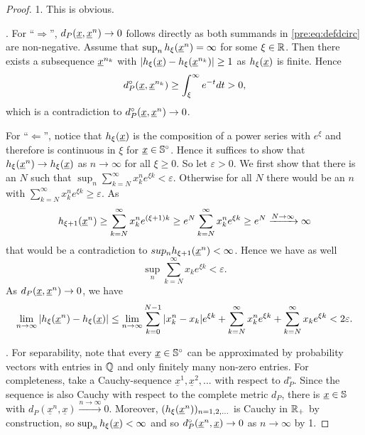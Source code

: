 \begin{proof}
1. This is obvious.

. For ``$\Rightarrow$'', $d_P(\underline{x},\underline{x}^n) \to 0$ follows directly as both summands in
\eqref{pre:eq:defdcirc} are non-negative. Assume that $\sup_n
h_\xi(\underline{x}^n) = \infty$ for some $\xi \in \mathbb{R}$. Then there exists a
subsequence $\underline{x}^{n_k}$ with $|h_\xi(\underline{x}) - h_\xi(\underline{x}^{n_k})| \geq 1 $ as $h_\xi(\underline{x})$ is finite. Hence
\[ d_P^\circ(\underline{x},\underline{x}^{n_k}) \geq \int_\xi^\infty e^{-t} dt > 0, \]
which is a contradiction to $d_P^\circ(\underline{x},\underline{x}^{n}) \to 0$.

\noindent
For ``$\Leftarrow$'', notice that $h_\xi(\underline{x})$ is the composition of a power series with 
$e^\xi$ and therefore is continuous in $\xi$ for $\underline{x} \in
\mathbb{S}^\circ$. Hence it suffices to show that $h_\xi(\underline{x}^n) \to h_\xi(\underline{x})$ as $n \to \infty$ for all $\xi \geq 0$. So
let $\varepsilon > 0$. We first show that there is an $N$ such that 
$\sup_n \sum_{k=N}^\infty x_k^n e^{\xi k} < \varepsilon$. Otherwise for all $N$ there would be an
$n$ with $\sum_{k=N}^\infty x_k^n e^{\xi k} \geq \varepsilon$. As
\[
h_{\xi+1}(\underline{x}^n) 
\geq \sum_{k=N}^\infty x_k^n e^{(\xi+1)k} 
\geq e^N \sum_{k=N}^\infty x_k^n e^{\xi k} 
\geq e^N
\xrightarrow{N\to\infty} \infty \]
that would be a contradiction to $sup_n h_{\xi+1}(\underline{x}^n) < \infty$. Hence we have as well
$$ \sup_n \sum_{k=N}^\infty x_k e^{\xi k} < \varepsilon .$$  
As $d_P(\underline{x},\underline{x}^n)
\to 0$, we have
\[ \lim_{n\to\infty}| h_\xi(\underline{x}^n) - h_\xi(\underline{x})| 
\leq \lim_{n\to\infty} \sum_{k=0}^{N-1} |x_k^n - x_k| e^{\xi k} + \sum_{k=N}^\infty
      x_k^n e^{\xi k} + \sum_{k=N}^\infty x_k e^{\xi k} 
< 2 \varepsilon. \]

.  For separability, note that every $\underline{x} \in \mathbb{S}^\circ$ can be approximated by
probability vectors with entries in $\mathbb{Q}$ and only finitely many non-zero entries. 
For completeness, take a Cauchy-sequence $\underline x^1, \underline x^2,...$ with respect to
$d_{P}^\circ$. Since the sequence is also Cauchy with respect to the complete metric $d_{P}$, there
is $\underline{x} \in \mathbb{S}$ with $d_{P}(\underline x^n, \underline x) \xrightarrow{n\to\infty} 0$.
Moreover, $(h_\xi(\underline{x}^n))_{n=1,2,...}$ is Cauchy in $\mathbb{R}_+$ by construction, so
$\sup_n h_\xi(\underline{x})<\infty$ and so $d_{P}^\circ(\underline{x}^n,\underline{x}) \to 0$ as $n \to\infty$ by
1.
\end{proof}

